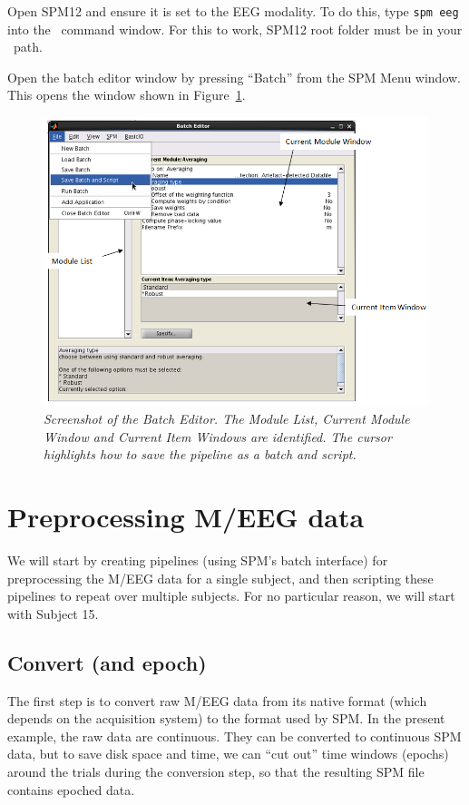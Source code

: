 Open SPM12 and ensure it is set to the EEG modality. To do this, type \texttt{spm eeg} into the \matlab\ command window. For this to work, SPM12 root folder must be in your \matlab\ path.

Open the batch editor window by pressing ``Batch'' from the SPM Menu window. This opens the window shown in Figure~\ref{multi:fig:1}. 

\begin{figure}
\begin{center}
\includegraphics[width=120mm]{multi/figures/figure1}
\caption{\em Screenshot of the Batch Editor. The Module List, Current Module Window and Current Item Windows are identified. The cursor highlights how to save the pipeline as a batch and script. \label{multi:fig:1}}
\end{center}
\end{figure}

\section{Preprocessing M/EEG data}

We will start by creating pipelines (using SPM's batch interface) for preprocessing the M/EEG data for a single subject, and then scripting these pipelines to repeat over multiple subjects. For no particular reason, we will start with Subject 15.

\subsection{Convert (and epoch)}

The first step is to convert raw M/EEG data from its native format (which depends on the acquisition system) to the format used by SPM.  In the present example, the raw data are continuous. They can be converted to continuous SPM data, but to save disk space and time, we can ``cut out'' time windows (epochs) around the trials during the conversion step, so that the resulting SPM file contains epoched data.

